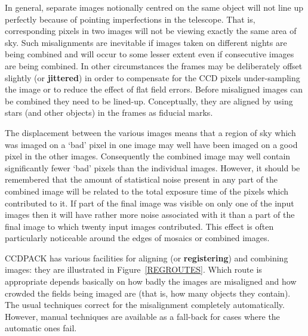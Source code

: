 \documentclass[twoside,11pt]{starlink}
\begin{document}
In general, separate images notionally centred on the same object will
not line up perfectly because of pointing imperfections in the telescope.
That is, corresponding pixels in two images will not be viewing exactly
the same area of sky.  Such misalignments are inevitable if images taken
on different nights are being combined and will occur to some lesser
extent even if consecutive images are being combined.  In other
circumstances the frames may be deliberately offset slightly (or \textbf{jittered}) in order to compensate for the CCD pixels under-sampling the
image or to reduce the effect of flat field errors.  Before misaligned
images can be combined they need to be lined-up.  Conceptually, they are
aligned by using stars (and other objects) in the frames as fiducial marks.

The displacement between the various images means that a region of sky
which was imaged on a `bad' pixel in one image may well have been imaged
on a good pixel in the other images.  Consequently the combined image may
well contain significantly fewer `bad' pixels than the individual images.
However, it should be remembered that the amount of statistical noise
present in any part of the combined image will be related to the
total exposure time of the pixels which contributed to it.  If part of the
final image was visible on only one of the input images then it will
have rather more noise associated with it than a part of the final image
to which twenty input images contributed.  This effect is often
particularly noticeable around the edges of mosaics or combined images.

CCDPACK has various facilities for aligning (or \textbf{registering}) and
combining images: they are illustrated in Figure~\ref{REGROUTES}.  Which
route is appropriate depends basically on how badly the images are
misaligned and how crowded the fields being imaged are (that is, how
many objects they contain).  The usual techniques correct for the
misalignment completely automatically.  However, manual techniques are
available as a fall-back for cases where the automatic ones fail.
\end{document}
